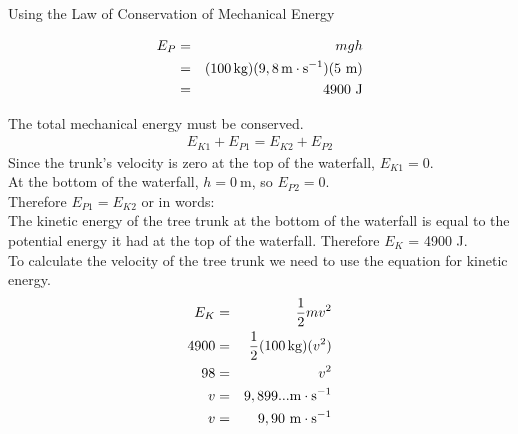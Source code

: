 \begin{wex}{Using the Law of Conservation of Mechanical Energy}
{
\begin{eqnarray*}
E_{P} &=& mgh\\
&=& (100\,\text{kg})(9,8\,\text{m} \cdot \text{s}^{-1})(5~\text{m})\\
&=& 4900~\text{J}
\end{eqnarray*}

The total mechanical energy must be conserved. 
\begin{eqnarray*}
E_{K1} + E_{P1} = E_{K2} + E_{P2}
\end{eqnarray*}
Since the trunk's velocity is zero at the top of the waterfall, $E_{K1}=0$. \\
At the bottom of the waterfall, $h = 0 \ \text{m}$, so $E_{P2}=0$. \\
Therefore $E_{P1} = E_{K2}$ or in words: \\
The kinetic energy of the tree trunk at the bottom of the waterfall is equal to the potential energy it had at the top of the waterfall. Therefore $E_{K}$ = 4900 J.\\

To calculate the velocity of the tree trunk we need to use the equation for kinetic energy.
\begin{eqnarray*}
E_{K} & = & \frac{1}{2}mv^2 \\
4900 &=& \frac{1}{2} (100\,\text{kg}) (v^2) \\
98 &=& v^2\\
v &=& 9,899... \text{m} \cdot \text{s}^{-1}\\
v &=& 9,90~ \text{m} \cdot \text{s}^{-1}
\end{eqnarray*}}
\end{wex}
    \noindent
\par



